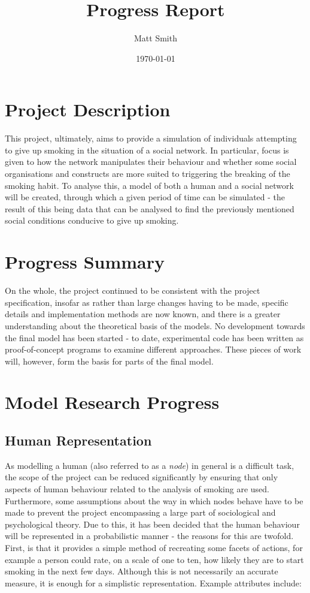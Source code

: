 \documentclass[]{article}
\begin{document}
\title{Progress Report}
\author{Matt Smith}
\date{\today}
\maketitle

\section{Project Description}

This project, ultimately, aims to provide a simulation of individuals attempting to give up smoking in the situation of a social network. In particular, focus is given to how the network manipulates their behaviour and whether some social organisations and constructs are more suited to triggering the breaking of the smoking habit. To analyse this, a model of both a human and a social network will be created, through which a given period of time can be simulated - the result of this being data that can be analysed to find the previously mentioned social conditions conducive to give up smoking.

\section{Progress Summary}

On the whole, the project continued to be consistent with the project specification, insofar as rather than large changes having to be made, specific details and implementation methods are now known, and there is a greater understanding about the theoretical basis of the models. No development towards the final model has been started - to date, experimental code has been written as proof-of-concept programs to examine different approaches. These pieces of work will, however, form the basis for parts of the final model.

\section{Model Research Progress}

\subsection{Human Representation}

As modelling a human (also referred to as a \emph{node}) in general is a difficult task, the scope of the project can be reduced significantly by ensuring that only aspects of human behaviour related to the analysis of smoking are used. Furthermore, some assumptions about the way in which nodes behave have to be made to prevent the project encompassing a large part of sociological and psychological theory. Due to this, it has been decided that the human behaviour will be represented in a probabilistic manner - the reasons for this are twofold. First, is that it provides a simple method of recreating some facets of actions, for example a person could rate, on a scale of one to ten, how likely they are to start smoking in the next few days. Although this is not necessarily an accurate measure, it is enough for a simplistic representation. Example attributes include:
\end{document}
